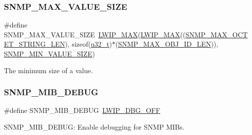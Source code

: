 \subsubsection{\texorpdfstring{S\+N\+M\+P\+\_\+\+M\+A\+X\+\_\+\+V\+A\+L\+U\+E\+\_\+\+S\+I\+ZE}{SNMP\_MAX\_VALUE\_SIZE}\hspace{0.1cm}{\footnotesize\ttfamily [2/2]}}
{\footnotesize\ttfamily \#define S\+N\+M\+P\+\_\+\+M\+A\+X\+\_\+\+V\+A\+L\+U\+E\+\_\+\+S\+I\+ZE~\hyperlink{openmote-cc2538_2lwip_2src_2include_2lwip_2def_8h_a21ea174d374106caeafb4aa3a24fbd2b}{L\+W\+I\+P\+\_\+\+M\+AX}(\hyperlink{openmote-cc2538_2lwip_2src_2include_2lwip_2def_8h_a21ea174d374106caeafb4aa3a24fbd2b}{L\+W\+I\+P\+\_\+\+M\+AX}((\hyperlink{group__snmp__opts_gae50cdd09697aa54a8b9f26432ac55ac2}{S\+N\+M\+P\+\_\+\+M\+A\+X\+\_\+\+O\+C\+T\+E\+T\+\_\+\+S\+T\+R\+I\+N\+G\+\_\+\+L\+EN}), sizeof(\hyperlink{group__compiler__abstraction_ga4c14294869aceba3ef9d4c0c302d0f33}{u32\+\_\+t})$\ast$(\hyperlink{group__snmp__opts_ga3ad9d293f90e3c885c4e3263a9064a41}{S\+N\+M\+P\+\_\+\+M\+A\+X\+\_\+\+O\+B\+J\+\_\+\+I\+D\+\_\+\+L\+EN})), \hyperlink{group__snmp__opts_gac815d0dbe576299546ac612e7eaf3f90}{S\+N\+M\+P\+\_\+\+M\+I\+N\+\_\+\+V\+A\+L\+U\+E\+\_\+\+S\+I\+ZE})}

The minimum size of a value. \mbox{\label{group__snmp__opts_gac12240265db443eaf9d31d187e586c16}} 
\subsubsection{\texorpdfstring{S\+N\+M\+P\+\_\+\+M\+I\+B\+\_\+\+D\+E\+B\+UG}{SNMP\_MIB\_DEBUG}\hspace{0.1cm}{\footnotesize\ttfamily [1/2]}}
{\footnotesize\ttfamily \#define S\+N\+M\+P\+\_\+\+M\+I\+B\+\_\+\+D\+E\+B\+UG~\hyperlink{group__debugging__levels_gadab1cdc3f45939a3a5c9a3d7e04987e1}{L\+W\+I\+P\+\_\+\+D\+B\+G\+\_\+\+O\+FF}}

S\+N\+M\+P\+\_\+\+M\+I\+B\+\_\+\+D\+E\+B\+UG\+: Enable debugging for S\+N\+MP M\+I\+Bs. \mbox{\label{group__snmp__opts_gac12240265db443eaf9d31d187e586c16}} 
